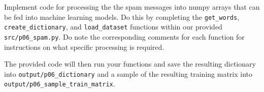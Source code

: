\item {}
Implement code for processing the the spam messages into numpy arrays that can be fed into machine learning models. Do this by completing the \texttt{get\_words}, \texttt{create\_dictionary}, and \texttt{load\_dataset} functions within our provided \texttt{src/p06\_spam.py}. Do note the corresponding comments for each function for instructions on what specific processing is required.

The provided code will then run your functions and save the resulting dictionary into \texttt{output/p06\_dictionary} and a sample of the resulting training matrix into \texttt{output/p06\_sample\_train\_matrix}.

\ifnum{} {
  
} \fi
